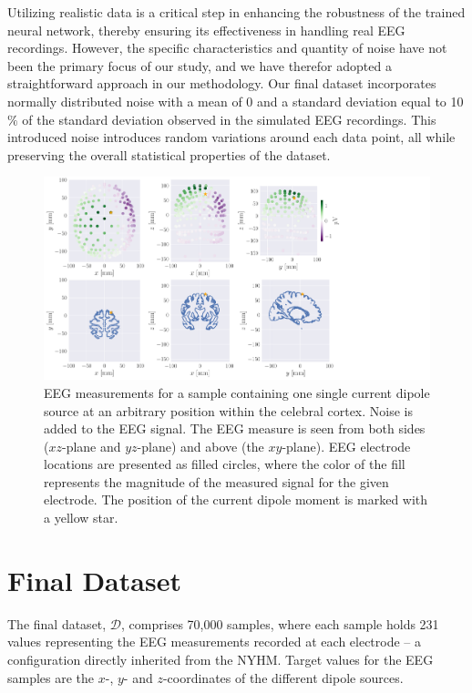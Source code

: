 \documentclass[a4paper, UKenglish, 11pt]{uiomaster}
\begin{document}
Utilizing realistic data is a critical step in enhancing the robustness of the trained neural network, thereby ensuring its effectiveness in handling real EEG recordings. However, the specific characteristics and quantity of noise have not been the primary focus of our study, and we have therefor adopted a straightforward approach in our methodology. Our final dataset incorporates normally distributed noise with a mean of 0 and a standard deviation equal to 10$\%$ of the standard deviation observed in the simulated EEG recordings. This introduced noise introduces random variations around each data point, all while preserving the overall statistical properties of the dataset.


\begin{figure}[!htb]
    \centering
    \hspace*{-3cm}
    \includegraphics[width=18cm]{figures/purple_green/simple_example.pdf}
    \caption{EEG measurements for a sample containing one single current dipole source at an arbitrary position within the celebral cortex. Noise is added to the EEG signal. The EEG measure is seen from both sides ($xz$-plane and $yz$-plane) and above (the $xy$-plane). EEG electrode locations are presented as filled circles, where the color of the fill represents the magnitude of the measured signal for the given electrode. The position of the current dipole moment is marked with a yellow star.}
    \label{fig:eeg_field_1_dipole_example}
\end{figure}


\section{Final Dataset} \label{chap:final_data}
The final dataset, $\mathcal{D}$, comprises 70,000 samples, where each sample holds 231 values representing the EEG measurements recorded at each electrode -- a configuration directly inherited from the NYHM. Target values for the EEG samples are the $x$-, $y$- and $z$-coordinates of the different dipole sources.
\end{document}
